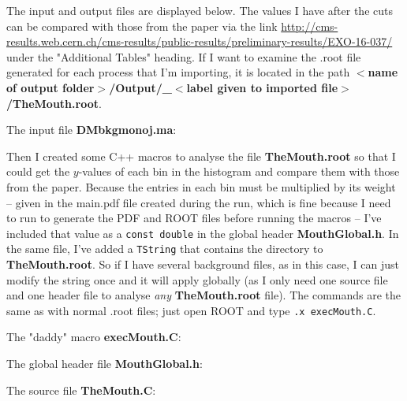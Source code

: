 The input and output files are displayed below. The values I have after the cuts can be compared with those from the paper via the link \url{http://cms-results.web.cern.ch/cms-results/public-results/preliminary-results/EXO-16-037/} under the "Additional Tables" heading. If I want to examine the .root file generated for each process that I'm importing, it is located in the path \textbf{$<$name of output folder$>$/Output/\_$<$label given to imported file$>$/TheMouth.root}.

The input file \textbf{DMbkgmonoj.ma}:



Then I created some C++ macros to analyse the file \textbf{TheMouth.root} so that I could get the $y$-values of each bin in the \etmiss histogram and compare them with those from the paper. Because the entries in each bin must be multiplied by its weight -- given in the main.pdf file created during the \madanalysis run, which is fine because I need to run \madanalysis to generate the PDF and ROOT files before running the macros -- I've included that value as a \texttt{const double} in the global header \textbf{MouthGlobal.h}. In the same file, I've added a \texttt{TString} that contains the directory to \textbf{TheMouth.root}. So if I have several background files, as in this case, I can just modify the string once and it will apply globally (as I only need one source file and one header file to analyse \emph{any} \textbf{TheMouth.root} file). The commands are the same as with normal .root files; just open ROOT and type \verb!.x execMouth.C!.

The "daddy" macro \textbf{execMouth.C}:



The global header file \textbf{MouthGlobal.h}:



The source file \textbf{TheMouth.C}:



